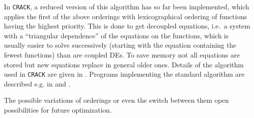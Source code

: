 In {\tt CRACK}, a reduced version of this algorithm has so far been
implemented, which applies the first of the above orderings with
lexicographical ordering of functions having the highest
priority. This is done to get decoupled equations, i.e.\ a system with
a ``triangular dependence'' of the equations on the functions,
which is usually easier to solve
successively (starting with the equation containing the fewest
functions) than are coupled DEs. To save memory not all equations
are stored but new equations replace in general older ones.
Details of the algorithm used
in {\tt CRACK} are given in \cite{Wo}.
Programs implementing the standard algorithm are described e.g. in
\cite{FS,Alex,Fush} and \cite{Reid1}.

The possible variations of orderings or even the switch between
them open possibilities for future optimization.

